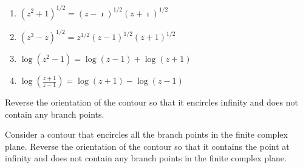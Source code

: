 {%
\begin{Hint}
  \label{hint z3112}
\end{Hint}








\begin{Hint}
  \label{hint z1z6z2}
\end{Hint}






\begin{Hint}
  \label{hint cos z12}
\end{Hint}






\begin{Hint}
  \label{hint z2112}
  \begin{enumerate}
  \item $\left( z^2 + 1 \right)^{1/2} = (z - \imath)^{1/2}  (z + \imath)^{1/2}$
  \item $\left( z^3 - z \right)^{1/2} = z^{1/2}  (z-1)^{1/2}  (z+1)^{1/2}$
  \item $\log \left( z^2 - 1 \right) = \log (z-1) + \log (z+1)$
  \item $\log \left( \frac{z+1}{z-1} \right) = \log (z+1) - \log (z-1)$
  \end{enumerate}
\end{Hint}










\begin{Hint}
  \label{hint z3812}
\end{Hint}







\begin{Hint}
  \label{hint bp inf 1}
  Reverse the orientation of the contour so that it encircles infinity and 
  does not contain any branch points.
\end{Hint}




\begin{Hint}
  \label{hint bp inf 2}
  Consider a contour that encircles all the branch points in the finite
  complex plane.  Reverse the orientation of the contour so that it 
  contains the point at infinity and does not contain any branch points in
  the finite complex plane.
\end{Hint}




}
